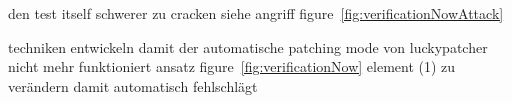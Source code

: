 den test itself schwerer zu cracken siehe angriff figure~\ref{fig:verificationNowAttack}

techniken entwickeln damit der automatische patching mode von luckypatcher nicht mehr funktioniert
ansatz figure~\ref{fig:verificationNow} element (1) zu verändern damit automatisch fehlschlägt

